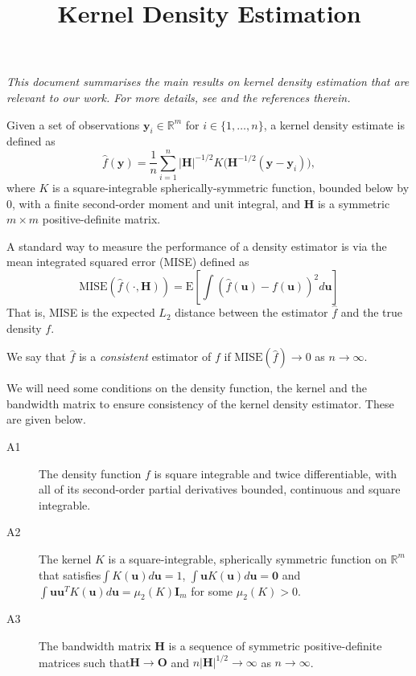 \documentclass[11pt]{article}
\newcommand{\R}{\mathbb{R}}
\begin{document}
\title{Kernel Density Estimation}
\maketitle

\emph{This document summarises the main results on kernel density estimation that are relevant to our work. For more details, see \citet{chacon2018multivariate} and the references therein.}

Given a set of observations $\bm{y}_{i} \in \R^m$ for $i \in \{1, \dots, n\}$, a kernel density estimate is defined as
\begin{equation}\label{eq:mkde}
  \hat{f}(\bm{y}) = \frac{1}{n} \sum_{i=1}^n |\bm{H}|^{-1/2} K\big(\bm{H}^{-1/2}(\bm{y} - \bm{y}_i)\big),
\end{equation}
where $K$ is a square-integrable spherically-symmetric function, bounded below by 0, with a finite second-order moment and unit integral, and $\bm{H}$ is a symmetric $m\times m$ positive-definite matrix.

A standard way to measure the performance of a density estimator is via the mean integrated squared error (MISE) defined as
$$
\text{MISE}(\hat{f}(\cdot, \bm{H})) = \text{E}\left[\int \left(\hat{f}(\bm{u}) - f(\bm{u})\right)^2 d\bm{u}\right]
$$
That is, MISE is the expected $L_2$ distance between the estimator $\hat{f}$ and the true density $f$.

We say that $\hat{f}$ is a \emph{consistent} estimator of $f$ if $\text{MISE}(\hat{f})\rightarrow 0$ as $n\rightarrow\infty$.

We will need some conditions on the density function, the kernel and the bandwidth matrix to ensure consistency of the kernel density estimator. These are given below.

\begin{description}
\item[A1] The density function $f$ is square integrable and twice differentiable, with all of its second-order partial derivatives bounded, continuous and square integrable.
\item[A2] The kernel $K$ is a square-integrable, spherically symmetric function on $\R^m$ that satisfies\break $\int K(\bm{u})d\bm{u} = 1$, $\int \bm{u} K(\bm{u})d\bm{u} = \bm{0}$ and $\int \bm{u}\bm{u}^T K(\bm{u})d\bm{u} = \mu_2(K)\bm{I}_m$ for some $\mu_2(K) > 0$.
\item[A3] The bandwidth matrix $\bm{H}$ is a sequence of symmetric positive-definite matrices such that\break $\bm{H}\rightarrow \bm{O}$ and $n|\bm{H}|^{1/2} \rightarrow \infty$ as $n\rightarrow\infty$.
\end{description}
\end{document}
